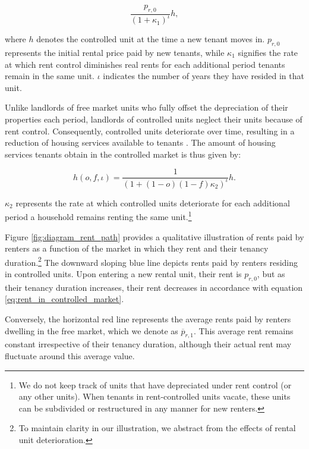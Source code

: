\documentclass[parskip=full]{article}
\begin{document}
\begin{equation}\label{eq:rent_in_controlled_market}
\frac{p_{r,0}}{(1+\kappa_{1})^{\iota}} h,
\end{equation} 

\noindent where $h$ denotes the controlled unit at the time a new tenant moves in. $p_{r,0}$ represents the initial rental price paid by new tenants, while $\kappa_{1}$ signifies the rate at which rent control diminishes real rents for each additional period tenants remain in the same unit. $\iota$ indicates the number of years they have resided in that unit.

Unlike landlords of free market units who fully offset the depreciation of their properties each period, landlords of controlled units neglect their units because of rent control. Consequently, controlled units deteriorate over time, resulting in a reduction of housing services available to tenants \citep{gl-1990,la-2018}. The amount of housing services tenants obtain in the controlled market is thus given by:

\begin{equation}
    h(o,f,\iota)=\frac{1}{(1+(1-o)(1-f)\kappa_{2})^{\iota}} h.
\end{equation}
 
\noindent $\kappa_{2}$ represents the rate at which controlled units deteriorate for each additional period a household remains renting the same unit.\footnote{We do not keep track of units that have depreciated under rent control (or any other units). When tenants in rent-controlled units vacate, these units can be subdivided or restructured in any manner for new renters.}

Figure \ref{fig:diagram_rent_path} provides a qualitative illustration of rents paid by renters as a function of the market in which they rent and their tenancy duration.\footnote{To maintain clarity in our illustration, we abstract from the effects of rental unit deterioration.} The downward sloping blue line depicts rents paid by renters residing in controlled units. Upon entering a new rental unit, their rent is $p_{r,0}$, but as their tenancy duration increases, their rent decreases in accordance with equation \eqref{eq:rent_in_controlled_market}.

Conversely, the horizontal red line represents the average rents paid by renters dwelling in the free market, which we denote as $\overline{p}_{r,1}$. This average rent remains constant irrespective of their tenancy duration, although their actual rent may fluctuate around this average value.
\end{document}
